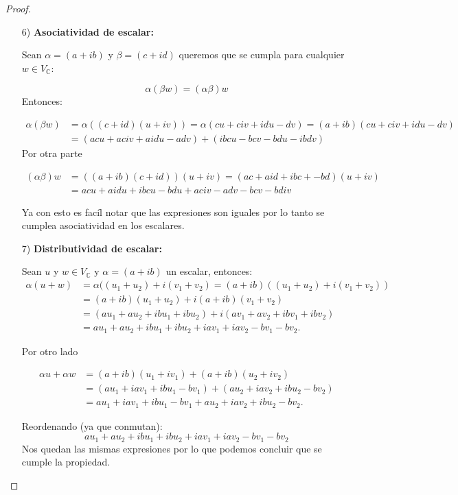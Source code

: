 \documentclass[11pt]{article}
\theoremstyle{definition} %
\begin{document}
\begin{proof}
\begin{enumerate}
  \item[6)] \textbf{Asociatividad de escalar:} 

Sean $\alpha = (a + ib)$ y $\beta = (c + id)$ queremos que se cumpla para cualquier $w \in V_\mathbb{C}$:

\[
\alpha(\beta w) = (\alpha\beta)w
\]
Entonces:

\[
  \begin{align*}
    \alpha(\beta w) &= \alpha((c + id)(u + iv))= \alpha(cu + civ + idu - dv)=(a + ib)(cu + civ + idu - dv) 
    \\
    &= (acu +aciv + aidu -adv) + (ibcu - bcv - bdu - ibdv)
  \end{align*}
\]
Por otra parte

\[
\begin{align*}
  (\alpha\beta)w &= ((a + ib)(c + id))(u +iv)= (ac +aid + ibc + -bd)(u +iv) 
  \\
  &= acu + aidu +ibcu -bdu + aciv -adv - bcv - bdiv
\end{align*}
\]

Ya con esto es facíl notar que las expresiones son iguales por lo tanto se cumplea asociatividad en los escalares.

\item[7)] \textbf{Distributividad de escalar:}

Sean $u$ y $w \in V_\mathbb{C}$ y $\alpha = (a + ib)$ un escalar, entonces:
\[
\begin{align*}
  \alpha(u + w) &= \alpha((u_1 + u_2) + i(v_1 + v_2) = (a + ib)((u_1+u_2) + i(v_1+ v_2)) 
  \\
  &= (a +ib)(u_1 + u_2) + i(a + ib)(v_1 + v_2)
  \\
  &= (au_1 + au_2 + ibu_1 + ibu_2) + i(av_1 + av_2 + ibv_1 + ibv_2)
  \\
  &= au_1 + au_2 + ibu_1 + ibu_2 + iav_1 + iav_2 - bv_1 -bv_2.
\end{align*}
\]

Por otro lado

\[
\begin{align*}
  \alpha u + \alpha w &= (a +ib)(u_1 + iv_1) + (a + ib)(u_2 + iv_2) \\
  &= (au_1 + iav_1 + ibu_1 -bv_1) + (au_2 + iav_2 + ibu_2 - bv_2) \\
  &= au_1 + iav_1 + ibu_1 -bv_1 + au_2 + iav_2 + ibu_2 - bv_2.
\end{align*}
\]
    
Reordenando (ya que conmutan):
\[
au_1 + au_2 + ibu_1 + ibu_2 + iav_1 + iav_2 -bv_1 -bv_2
\]
Nos quedan las mismas expresiones por lo que podemos concluir que se cumple la propiedad.


\end{enumerate}
\end{proof}
\end{document}
